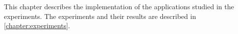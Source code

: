 This chapter describes the implementation of the applications studied in the experiments. The experiments and their results are described in \ref{chapter:experiments}. 

